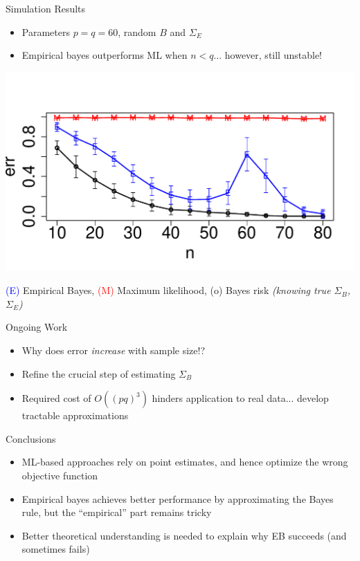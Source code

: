 \documentclass[final]{beamer}
\newlength{\onecolwid}
\begin{document}
\begin{frame}[t]
\begin{columns}[t]
\begin{column}{\onecolwid}
\begin{block}{Simulation Results}
\begin{itemize}
\item Parameters $p = q = 60$, random $B$ and $\Sigma_E$
\item Empirical bayes outperforms ML when $n < q$... however, still unstable!
\end{itemize}
\begin{center}
\includegraphics[scale = 1.3]{simulation1.pdf}
\end{center}
\small{
 \textcolor{blue}{(E)} Empirical Bayes,  \textcolor{red}{(M)} Maximum likelihood,
(o) Bayes risk \emph{(knowing true $\Sigma_B$, $\Sigma_E$)}}
\end{block}

\begin{block}{Ongoing Work}
\begin{itemize}
\item Why does error \emph{increase} with sample size!?
\item Refine the crucial step of estimating $\Sigma_B$
\item Required cost of $O((pq)^3)$ hinders application to real data... develop tractable approximations
\end{itemize}
\end{block}


\begin{block}{Conclusions}
\begin{itemize}
\item ML-based approaches rely on point estimates, and hence optimize the wrong objective function
\item Empirical bayes achieves better performance by approximating the Bayes rule, but the ``empirical'' part remains tricky
\item Better theoretical understanding is needed to explain why EB succeeds (and sometimes fails)
\end{itemize}
\end{block}


\end{column}
\end{columns}
\end{frame}
\end{document}
